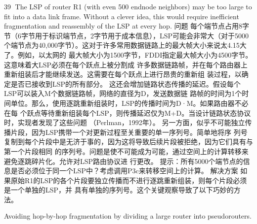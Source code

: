                                                     39
The LSP of router R1 (with even 500 endnode neighbors) may be too large to fit into a data link
frame. Without a clever idea, this would require inefficient fragmentation and reassembly of the
LSP at every hop.
问题
每个端节点占用8字节（6字节用于标识端节点，2字节用于成本信息），LSP可能会非常大（对于5000
个端节点为40,000字节）。这对于许多常用数据链路上的最大帧大小来说太4.15大了。例如，以太网的
最大帧大小为1500字节，FDDI指定最大帧大小为4500字节。这意味着大LSP必须在每个跃点上被分割成
许多数据链路帧，并在每个路由器上重新组装后才能继续发送。这需要在每个跃点上进行昂贵的重新组
装过程，以确定是否已接收到LSP的所有部分。
这还会增加链路状态传播的延迟。假设每个LSP可以装入M个数据链路帧，网络的直径为D，发送数据链
路帧的时间为1个时间单位。那么，使用逐跳重新组装时，LSP的传播时间为D·M。如果路由器不必在每
个跃点等待重新组装每个LSP，则传播延迟仅为M+D。当设计链路状态协议时，实现者发现了这些问题
（Perlman，1992年）。
另一方面，似乎不可能独立传播片段，因为LSP携带一个对更新过程至关重要的单一序列号。简单地将序
列号复制到每个片段中是无济于事的，因为这将导致后续片段被拒绝，因为它们具有与第一个片段相同
的序列号。问题是使不可能成为可能，通过空间上的计算转移来避免逐跳碎片化。允许对LSP路由协议进
行更改。
提示：所有5000个端节点的信息是否必须位于同一个LSP中？考虑调用P3c来转移空间上的计算。
解决方案
如果原始R1的LSP的各个片段要独立传播而不进行逐跳重新组装，则每个片段必须是一个单独的LSP，并
具有单独的序列号。这个关键观察导致了以下巧妙的方法。




Avoiding hop-by-hop fragmentation by dividing a large router into pseudorouters.


